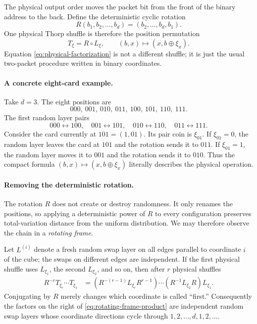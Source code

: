 \documentclass[11pt]{article}
\numberwithin{equation}{section}
\theoremstyle{definition}\newtheorem{definition}[theorem]{Definition}
\theoremstyle{remark}\newtheorem{remark}[theorem]{Remark}
\begin{document}
The physical output order moves the packet bit from the front of the binary
address to the back.  Define the deterministic cyclic rotation
\begin{equation}\label{eq:rotation}
 R(b_1,b_2,\ldots,b_d)=(b_2,\ldots,b_d,b_1).
\end{equation}
One physical Thorp shuffle is therefore the position permutation
\begin{equation}\label{eq:physical-factorization}
 T_\xi=R\circ L_\xi,
 \qquad
 (b,x)\longmapsto (x,b\oplus\xi_x).
\end{equation}
Equation \eqref{eq:physical-factorization} is not a different shuffle; it is
just the usual two-packet procedure written in binary coordinates.

\paragraph{A concrete eight-card example.}
Take $d=3$.  The eight positions are
\[
 000,\ 001,\ 010,\ 011,\ 100,\ 101,\ 110,\ 111.
\]
The first random layer pairs
\[
 000\leftrightarrow100,\quad
 001\leftrightarrow101,\quad
 010\leftrightarrow110,\quad
 011\leftrightarrow111.
\]
Consider the card currently at $101=(1,01)$.  Its pair coin is $\xi_{01}$.
If $\xi_{01}=0$, the random layer leaves the card at $101$ and the rotation
sends it to $011$.  If $\xi_{01}=1$, the random layer moves it to $001$ and
the rotation sends it to $010$.  Thus the compact formula
$(b,x)\mapsto(x,b\oplus\xi_x)$ literally describes the physical operation.

\paragraph{Removing the deterministic rotation.}
The rotation $R$ does not create or destroy randomness.  It only renames the
positions, so applying a deterministic power of $R$ to every configuration
preserves total-variation distance from the uniform distribution.  We may
therefore observe the chain in a \emph{rotating frame}.

Let $L^{(i)}$ denote a fresh random swap layer on all edges parallel to
coordinate $i$ of the cube; the swaps on different edges are independent.
If the first physical shuffle uses $L_{\xi_1}$, the second $L_{\xi_2}$, and so
on, then after $r$ physical shuffles
\begin{align}\label{eq:rotating-frame-product}
 R^{-r}T_{\xi_r}\cdots T_{\xi_1}
 &=(R^{-(r-1)}L_{\xi_r}R^{r-1})\cdots
   (R^{-1}L_{\xi_2}R)L_{\xi_1}.
\end{align}
Conjugating by $R$ merely changes which coordinate is called ``first.''
Consequently the factors on the right of \eqref{eq:rotating-frame-product}
are independent random swap layers whose coordinate directions cycle through
$1,2,\ldots,d,1,2,\ldots$.
\end{document}
